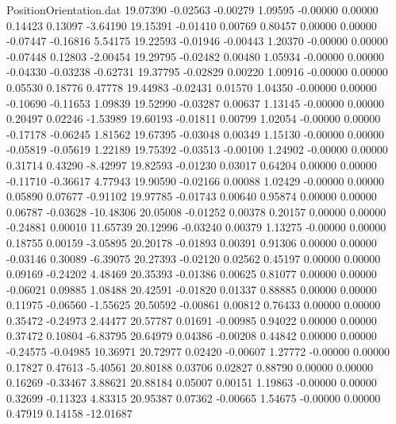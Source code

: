 \begin{filecontents}{PositionOrientation.dat}
  19.07390   -0.02563   -0.00279     1.09595   -0.00000    0.00000    0.14423    0.13097   -3.64190
  19.15391   -0.01410    0.00769     0.80457    0.00000    0.00000   -0.07447   -0.16816    5.54175
  19.22593   -0.01946   -0.00443     1.20370   -0.00000    0.00000   -0.07448    0.12803   -2.00454
  19.29795   -0.02482    0.00480     1.05934   -0.00000    0.00000   -0.04330   -0.03238   -0.62731
  19.37795   -0.02829    0.00220     1.00916   -0.00000    0.00000    0.05530    0.18776    0.47778
  19.44983   -0.02431    0.01570     1.04350   -0.00000    0.00000   -0.10690   -0.11653    1.09839
  19.52990   -0.03287    0.00637     1.13145   -0.00000    0.00000    0.20497    0.02246   -1.53989
  19.60193   -0.01811    0.00799     1.02054   -0.00000    0.00000   -0.17178   -0.06245    1.81562
  19.67395   -0.03048    0.00349     1.15130   -0.00000    0.00000   -0.05819   -0.05619    1.22189
  19.75392   -0.03513   -0.00100     1.24902   -0.00000    0.00000    0.31714    0.43290   -8.42997
  19.82593   -0.01230    0.03017     0.64204    0.00000    0.00000   -0.11710   -0.36617    4.77943
  19.90590   -0.02166    0.00088     1.02429   -0.00000    0.00000    0.05890    0.07677   -0.91102
  19.97785   -0.01743    0.00640     0.95874    0.00000    0.00000    0.06787   -0.03628  -10.48306
  20.05008   -0.01252    0.00378     0.20157    0.00000    0.00000   -0.24881    0.00010   11.65739
  20.12996   -0.03240    0.00379     1.13275   -0.00000    0.00000    0.18755    0.00159   -3.05895
  20.20178   -0.01893    0.00391     0.91306    0.00000    0.00000   -0.03146    0.30089   -6.39075
  20.27393   -0.02120    0.02562     0.45197    0.00000    0.00000    0.09169   -0.24202    4.48469
  20.35393   -0.01386    0.00625     0.81077    0.00000    0.00000   -0.06021    0.09885    1.08488
  20.42591   -0.01820    0.01337     0.88885    0.00000    0.00000    0.11975   -0.06560   -1.55625
  20.50592   -0.00861    0.00812     0.76433    0.00000    0.00000    0.35472   -0.24973    2.44477
  20.57787    0.01691   -0.00985     0.94022    0.00000    0.00000    0.37472    0.10804   -6.83795
  20.64979    0.04386   -0.00208     0.44842    0.00000    0.00000   -0.24575   -0.04985   10.36971
  20.72977    0.02420   -0.00607     1.27772   -0.00000    0.00000    0.17827    0.47613   -5.40561
  20.80188    0.03706    0.02827     0.88790    0.00000    0.00000    0.16269   -0.33467    3.88621
  20.88184    0.05007    0.00151     1.19863   -0.00000    0.00000    0.32699   -0.11323    4.83315
  20.95387    0.07362   -0.00665     1.54675   -0.00000    0.00000    0.47919    0.14158  -12.01687

\end{filecontents}
